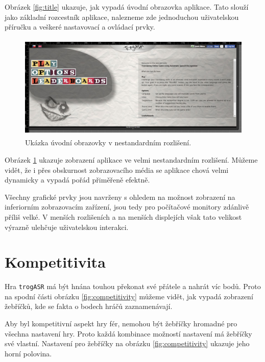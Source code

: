 Obrázek \ref{fig:title} ukazuje, jak vypadá úvodní obrazovka aplikace. Tato slouží jako základní rozcestník aplikace, nalezneme zde jednoduchou uživatelskou příručku a veškeré nastavovací a ovládací prvky.

\begin{figure}[h]
	\centering
	\includegraphics[width=140mm,height=50mm]{img/title_stretch.jpg}
	\caption{Ukázka úvodní obrazovky v nestandardním rozlišení.}
	\label{fig:title_stretch}
\end{figure}

Obrázek \ref{fig:title_stretch} ukazuje zobrazení aplikace ve velmi nestandardním rozlišení. Můžeme vidět, že i přes obskurnost zobrazovacího média se aplikace chová velmi dynamicky a vypadá pořád přiměřeně efektně.

Všechny grafické prvky jsou navrženy s ohledem na možnost zobrazení na inferiorním zobrazovacím zařízení, jsou tedy pro počítačové monitory zdánlivě příliš velké. V menších rozlišeních a na menších displejích však tato velikost výrazně ulehčuje uživatelskou interakci.

\section{Kompetitivita}

Hra \verb|trogASR| má být hnána touhou překonat své přátele a nahrát víc bodů. Proto na spodní části obrázku \ref{fig:competitivity} můžeme vidět, jak vypadá zobrazení žebříčků, kde se fakta o bodech hráčů zaznamenávají. 

Aby byl kompetitivní aspekt hry fér, nemohou být žebříčky hromadné pro všechna nastavení hry. Proto každá kombinace možností nastavení má žebříčky své vlastní. Nastavení pro žebříčky na obrázku \ref{fig:competitivity} ukazuje jeho horní polovina.

